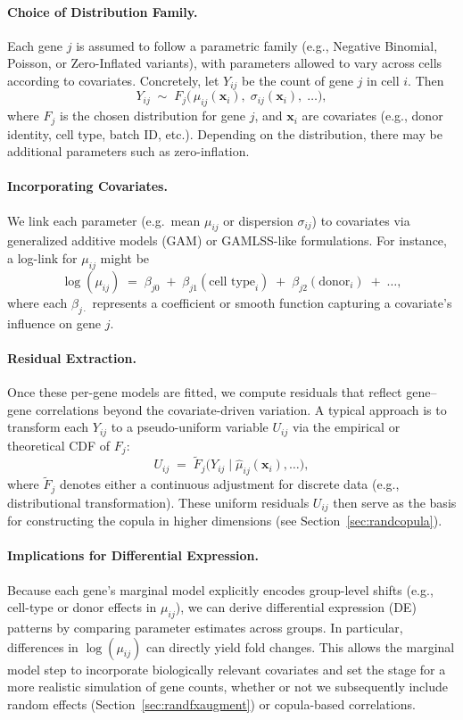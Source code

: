 \documentclass{article}
\begin{document}
\paragraph{Choice of Distribution Family.}
Each gene $j$ is assumed to follow a parametric family (e.g., Negative Binomial, Poisson, or Zero-Inflated variants), with parameters allowed to vary across cells according to covariates. Concretely, let $Y_{ij}$ be the count of gene $j$ in cell $i$. Then
\[
Y_{ij} \;\sim\; F_{j}\bigl(\,\mu_{ij}(\mathbf{x}_{i}),\;\sigma_{ij}(\mathbf{x}_{i}),\;\dots\bigr),
\]
where $F_{j}$ is the chosen distribution for gene $j$, and $\mathbf{x}_{i}$ are covariates (e.g., donor identity, cell type, batch ID, etc.). Depending on the distribution, there may be additional parameters such as zero-inflation.

\paragraph{Incorporating Covariates.}
We link each parameter (e.g.\ mean $\mu_{ij}$ or dispersion $\sigma_{ij}$) to covariates via generalized additive models (GAM) or GAMLSS-like formulations. For instance, a log-link for $\mu_{ij}$ might be
\[
\log(\mu_{ij}) \;=\;\beta_{j0} \;+\;\beta_{j1}(\text{cell type}_i)\;+\;\beta_{j2}(\text{donor}_i)\;+\;\dots,
\]
where each $\beta_{j\cdot}$ represents a coefficient or smooth function capturing a covariate's influence on gene $j$.

\paragraph{Residual Extraction.}
Once these per-gene models are fitted, we compute residuals that reflect gene--gene correlations beyond the covariate-driven variation. A typical approach is to transform each $Y_{ij}$ to a pseudo-uniform variable $U_{ij}$ via the empirical or theoretical CDF of $F_{j}$:
\[
U_{ij} \;=\; \tilde{F}_{j}\bigl(Y_{ij} \mid \widehat{\mu}_{ij}(\mathbf{x}_{i}),\dots\bigr),
\]
where $\tilde{F}_{j}$ denotes either a continuous adjustment for discrete data (e.g., distributional transformation). These uniform residuals $U_{ij}$ then serve as the basis for constructing the copula in higher dimensions (see Section~\ref{sec:randcopula}).

\paragraph{Implications for Differential Expression.}
Because each gene's marginal model explicitly encodes group-level shifts (e.g., cell-type or donor effects in $\mu_{ij}$), we can derive differential expression (DE) patterns by comparing parameter estimates across groups. In particular, differences in $\log(\mu_{ij})$ can directly yield fold changes. This allows the marginal model step to incorporate biologically relevant covariates and set the stage for a more realistic simulation of gene counts, whether or not we subsequently include random effects (Section~\ref{sec:randfxaugment}) or copula-based correlations.
\end{document}

